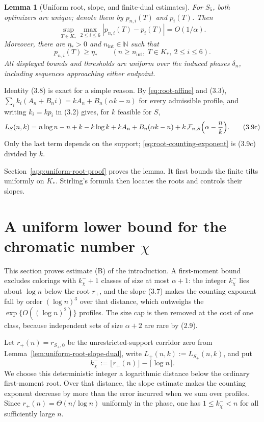 \documentclass[a4paper,10pt,reqno]{amsart}
\numberwithin{equation}{section}
\theoremstyle{plain}
\newtheorem{lemma}[theorem]{Lemma}
\theoremstyle{remark}
\begin{document}
\begin{lemma}[Uniform root, slope, and finite-dual estimates]
For $S_5$, both optimizers are unique; denote them by $p_{n,i}(T)$ and
$p_i(T)$. Then
\begin{equation*}
  \sup_{T\in K_*}\max_{2\le i\le6}
  |p_{n,i}(T)-p_i(T)|=O(1/\alpha).
  \tag{3.9b}
\end{equation*}
Moreover, there are $\eta_*>0$ and $n_{\mathrm{int}}\in\mathbb N$ such that
\[
  p_{n,i}(T)\ge\eta_*
  \qquad
  (n\ge n_{\mathrm{int}},\ T\in K_*,\ 2\le i\le6).
\]
All displayed bounds and thresholds are uniform over the induced
phases $\delta_n$, including sequences approaching either endpoint.
\end{lemma}

Identity (3.8) is exact for a simple reason. By \eqref{eq:root-affine} and
(3.3), $\sum_ik_i(A_n+B_ni)=kA_n+B_n(\alpha k-n)$ for every admissible
profile, and writing $k_i=kp_i$ in (3.2) gives, for $k$ feasible for $S$,
\begin{equation*}
  L_S(n,k)=n\log n-n+k-k\log k+kA_n+B_n(\alpha k-n)
           +k\,\mathcal F_{n,S}\Bigl(\alpha-\frac nk\Bigr).
  \tag{3.9c}
\end{equation*}
Only the last term depends on the support;
\eqref{eq:root-counting-exponent} is (3.9c) divided by $k$.

Section~\ref{app:uniform-root-proof} proves the lemma. It first bounds
the finite tilts uniformly on \(K_*\). Stirling's formula then locates the
roots and controls their slopes.

\section{\texorpdfstring{A uniform lower bound for the chromatic number $\chi$}{A uniform lower bound for the chromatic number}}
\label{a-valid-unrestricted-lower-location-for-chi}

This section proves estimate (B) of the introduction. A first-moment bound
excludes colorings with $k_\chi^-+1$ classes of size at most $\alpha+1$:
the integer $k_\chi^-$ lies about $\log n$ below the root $r_+$, and the
slope (3.7) makes the counting exponent fall by order $(\log n)^3$ over
that distance, which outweighs the $\exp\{O((\log n)^2)\}$ profiles. The
size cap is then removed at the cost of one class, because independent sets
of size $\alpha+2$ are rare by (2.9).

Let $r_+(n)=r_{S_+,0}$ be the unrestricted-support corridor zero from
Lemma~\ref{lem:uniform-root-slope-dual}, write
$L_+(n,k):=L_{S_+}(n,k)$, and put
\begin{equation*}
  k_\chi^-:=\lfloor r_+(n)\rfloor-\lceil\log n\rceil.
  \tag{4.1}
\end{equation*}
We choose this deterministic integer a logarithmic distance below the
ordinary first-moment root. Over that distance, the slope estimate makes
the counting exponent decrease by more than the error incurred when we
sum over profiles. Since
$r_+(n)=\Theta(n/\log n)$ uniformly in the phase, one has
$1\le k_\chi^-<n$ for all sufficiently large $n$.
\end{document}
